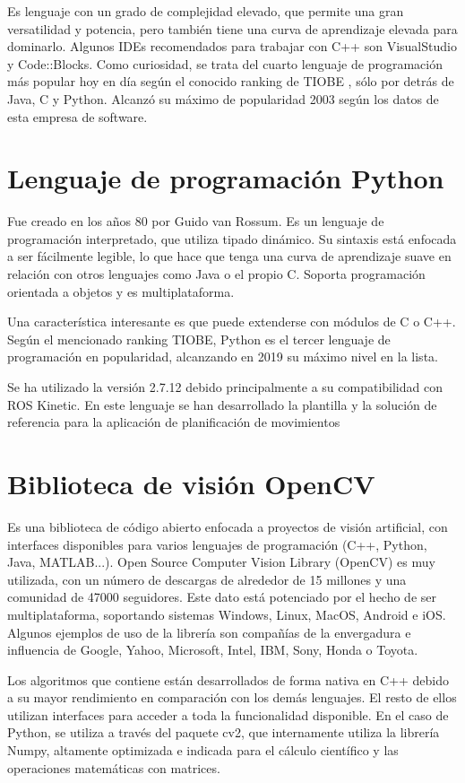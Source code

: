 \documentclass[12pt,spanish,chapterprefix, numbers=noenddot]{book}
\numberwithin{equation}{section}
\numberwithin{figure}{section}
\begin{document}
Es lenguaje con un grado de complejidad elevado, que permite una gran versatilidad y potencia, pero también tiene una curva de aprendizaje elevada para dominarlo.
Algunos IDEs recomendados para trabajar con C++ son VisualStudio y Code::Blocks. 
Como curiosidad, se trata del cuarto lenguaje de programación más popular hoy en día según el conocido ranking de TIOBE \cite{tiobe}, sólo por detrás de Java, C y Python. Alcanzó su máximo de popularidad 2003 según los datos de esta empresa de software. 

\section{Lenguaje de programación Python}
Fue creado en los años 80 por Guido van Rossum. Es un lenguaje de programación interpretado, que utiliza tipado dinámico. Su sintaxis está enfocada a ser fácilmente legible, lo que hace que tenga una curva de aprendizaje suave en relación con otros lenguajes como Java o el propio C. Soporta programación orientada a objetos y es multiplataforma.

Una característica interesante es que puede extenderse con módulos de C o C++.
Según el mencionado ranking TIOBE, Python es el tercer lenguaje de programación en popularidad, alcanzando en 2019 su máximo nivel en la lista. 

Se ha utilizado la versión 2.7.12 debido principalmente a su compatibilidad con ROS Kinetic. En este lenguaje se han desarrollado la plantilla y la solución de referencia para la aplicación de planificación de movimientos 

\section{Biblioteca de visión OpenCV}
Es una biblioteca de código abierto enfocada a proyectos de visión artificial, con interfaces disponibles para varios lenguajes de programación (C++, Python, Java, MATLAB...). Open Source Computer Vision Library (OpenCV) \cite{opencv} es muy utilizada, con un número de descargas de alrededor de 15 millones y una comunidad de 47000 seguidores. Este dato está potenciado por el hecho de ser multiplataforma, soportando sistemas Windows, Linux, MacOS, Android e iOS. 
Algunos ejemplos de uso de la librería son compañías de la envergadura e influencia de Google, Yahoo, Microsoft, Intel, IBM, Sony, Honda o Toyota.

Los algoritmos que contiene están desarrollados de forma nativa en C++ debido a su mayor rendimiento en comparación con los demás lenguajes. El resto de ellos utilizan interfaces para acceder a toda la funcionalidad disponible. 
En el caso de Python, se utiliza a través del paquete cv2, que internamente utiliza la librería Numpy, altamente optimizada e indicada para el cálculo científico y las operaciones matemáticas con matrices. 
\end{document}
